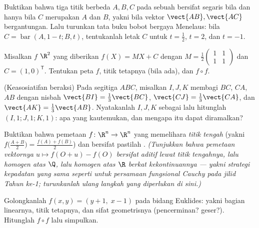 \begin{exercise}[$\star$]\label{exo:b2:affine:2}
Buktikan bahwa tiga titik berbeda $A, B, C$ pada sebuah 
bersifat segaris bila dan hanya bila $C$ merupakan  $A$ dan $B$, yakni bila vektor
$\vect{AB}, \vect{AC}$ bergantungan. Lalu turunkan tata buku bobot
bergaya Menelaus: bila $C = \operatorname{bar}(A, 1 - t; B, t)$, tentukanlah letak
$C$ untuk $t = \frac12$, $t = 2$, dan $t = -1$.
\end{exercise}

\begin{exercise}[$\star$]\label{exo:b2:affine:3}
Misalkan $f$  $\R^2$ yang diberikan $f(X) = MX + C$ dengan
$M = \frac12\begin{pmatrix} 1 & 1\\ 1 & 1\end{pmatrix}$ dan $C =
(1, 0)^{\mathsf T}$. Tentukan peta $f$, titik tetapnya
(bila ada), dan $f \circ f$.
\end{exercise}

\begin{exercise}[$\star\star$]\label{exo:b2:affine:4}
(Keasosiatifan beraksi) Pada segitiga $ABC$, misalkan $I, J, K$ membagi
$BC$, $CA$, $AB$ dengan nisbah $\vect{BI} = \frac13\vect{BC}$,
$\vect{CJ} = \frac13\vect{CA}$, dan $\vect{AK} = \frac13\vect{AB}$.
Nyatakanlah $I, J, K$ sebagai  lalu hitunglah 
$(I,1;J,1;K,1)$: apa yang kautemukan, dan mengapa itu dapat diramalkan?
\end{exercise}

\begin{exercise}[$\star\star$]\label{exo:b2:affine:5}
Buktikan bahwa pemetaan $f \colon \R^n \to \R^n$ yang memelihara \emph{titik tengah}
(yakni $f\bigl(\frac{A+B}{2}\bigr) = \frac{f(A) + f(B)}{2}$) dan
bersifat \emph{} pastilah . \emph{(Tunjukkan bahwa pemetaan vektornya $u \mapsto
f(O + u) - f(O)$ bersifat aditif lewat titik tengahnya, lalu
homogen atas $\Q$, lalu homogen atas $\R$ berkat kekontinuannya ---
yakni strategi kepadatan yang sama seperti untuk persamaan fungsional Cauchy pada
jilid Tahun ke-1; turunkanlah ulang langkah yang diperlukan di sini.)}
\end{exercise}

\begin{exercise}[$\star\star$]\label{exo:b2:affine:6}
Golongkanlah  $f(x, y) = (y + 1,\; x - 1)$ pada bidang
Euklides: yakni bagian linearnya, titik tetapnya, dan sifat geometrisnya
(pencerminan? geser?). Hitunglah $f \circ f$ lalu simpulkan.
\end{exercise}

